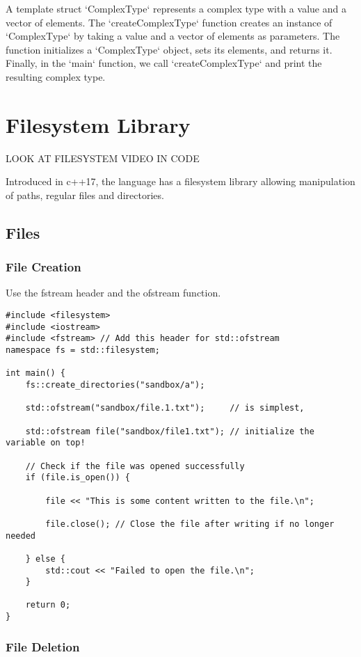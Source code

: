 A template struct `ComplexType` represents a complex type with a value and a vector of elements. 
The `createComplexType` function creates an instance of `ComplexType` by taking a value and a vector of elements
as parameters. The function initializes a `ComplexType` object, sets its elements, and returns it. 
Finally, in the `main` function, we call `createComplexType` and print the resulting complex type.

\chapter{Filesystem Library}

LOOK AT FILESYSTEM VIDEO IN CODE

Introduced in c++17, the language has a filesystem library allowing
manipulation of paths, regular files and directories.

\section{Files}

\subsection{File Creation}

Use the fstream header and the ofstream function.

\begin{verbatim}
#include <filesystem>
#include <iostream>
#include <fstream> // Add this header for std::ofstream
namespace fs = std::filesystem;

int main() {
    fs::create_directories("sandbox/a");

    std::ofstream("sandbox/file.1.txt");     // is simplest,

    std::ofstream file("sandbox/file1.txt"); // initialize the variable on top!

    // Check if the file was opened successfully
    if (file.is_open()) {

        file << "This is some content written to the file.\n";

        file.close(); // Close the file after writing if no longer needed

    } else {
        std::cout << "Failed to open the file.\n";
    }

    return 0;
}
\end{verbatim}


\subsection{File Deletion}

